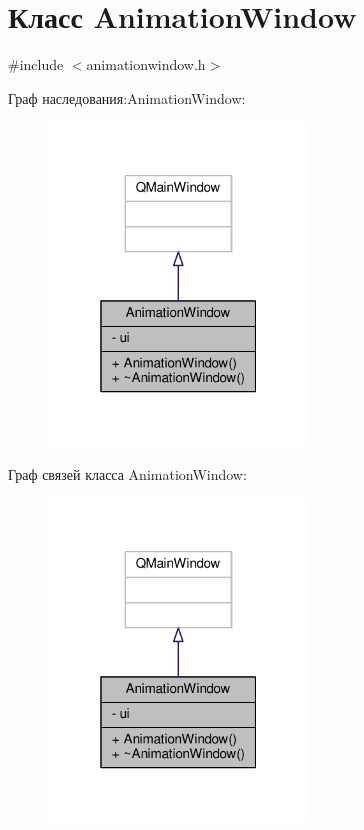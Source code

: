 \hypertarget{class_animation_window}{}\section{Класс Animation\+Window}
\label{class_animation_window}


{\ttfamily \#include $<$animationwindow.\+h$>$}



Граф наследования\+:Animation\+Window\+:
\nopagebreak
\begin{figure}[H]
\begin{center}
\leavevmode
\includegraphics[width=196pt]{d4/d61/class_animation_window__inherit__graph}
\end{center}
\end{figure}


Граф связей класса Animation\+Window\+:
\nopagebreak
\begin{figure}[H]
\begin{center}
\leavevmode
\includegraphics[width=196pt]{da/d3c/class_animation_window__coll__graph}
\end{center}
\end{figure}
